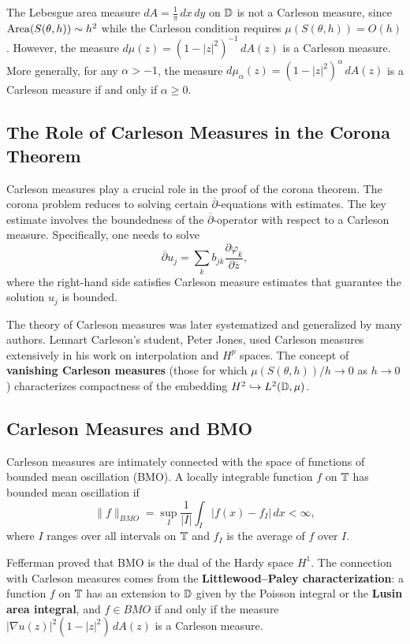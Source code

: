 \begin{example}
The Lebesgue area measure \(dA = \frac{1}{\pi}\,dx\,dy\) on \(\mathbb{D}\) is not a Carleson measure, since \(\operatorname{Area}(S(\theta, h)) \sim h^2\) while the Carleson condition requires \(\mu(S(\theta, h)) = O(h)\). However, the measure \(d\mu(z) = (1-|z|^2)^{-1}\,dA(z)\) is a Carleson measure. More generally, for any \(\alpha > -1\), the measure \(d\mu_\alpha(z) = (1-|z|^2)^{\alpha}\,dA(z)\) is a Carleson measure if and only if \(\alpha \geq 0\).
\end{example}

\subsection{The Role of Carleson Measures in the Corona Theorem}

Carleson measures play a crucial role in the proof of the corona theorem. The corona problem reduces to solving certain \(\overline{\partial}\)-equations with estimates. The key estimate involves the boundedness of the \(\overline{\partial}\)-operator with respect to a Carleson measure. Specifically, one needs to solve
\[
\overline{\partial} u_j = \sum_k b_{jk} \frac{\partial \varphi_k}{\partial \overline{z}},
\]
where the right-hand side satisfies Carleson measure estimates that guarantee the solution \(u_j\) is bounded.

The theory of Carleson measures was later systematized and generalized by many authors. Lennart Carleson's student, Peter Jones, used Carleson measures extensively in his work on interpolation and \(H^p\) spaces. The concept of \textbf{vanishing Carleson measures} (those for which \(\mu(S(\theta, h))/h \to 0\) as \(h \to 0\)) characterizes compactness of the embedding \(H^2 \hookrightarrow L^2(\mathbb{D}, \mu)\).

\subsection{Carleson Measures and BMO}

Carleson measures are intimately connected with the space of functions of bounded mean oscillation (BMO). A locally integrable function \(f\) on \(\mathbb{T}\) has bounded mean oscillation if
\[
\|f\|_{BMO} = \sup_I \frac{1}{|I|} \int_I |f(x) - f_I|\,dx < \infty,
\]
where \(I\) ranges over all intervals on \(\mathbb{T}\) and \(f_I\) is the average of \(f\) over \(I\).

Fefferman proved that BMO is the dual of the Hardy space \(H^1\). The connection with Carleson measures comes from the \textbf{Littlewood--Paley characterization}: a function \(f\) on \(\mathbb{T}\) has an extension to \(\mathbb{D}\) given by the Poisson integral or the \textbf{Lusin area integral}, and \(f \in BMO\) if and only if the measure \(|\nabla u(z)|^2 (1-|z|^2)\,dA(z)\) is a Carleson measure.


